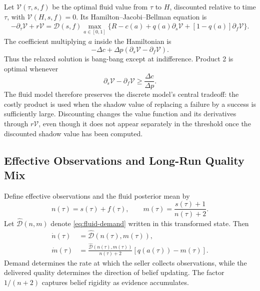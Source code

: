\documentclass[opre]{informs3}
\begin{document}
Let $\mathcal{V}(\tau,s,f)$ be the optimal fluid value from $\tau$ to $H$,
discounted relative to time $\tau$, with $\mathcal{V}(H,s,f)=0$. Its
Hamilton--Jacobi--Bellman equation is
\begin{equation}
\begin{aligned}
    -\partial_\tau\mathcal{V}+r\mathcal{V}
    =
    \mathcal{D}(s,f)
    \max_{a\in[0,1]}
    \big\{
        R-c(a)
        +q(a)\partial_s\mathcal{V}
        +[1-q(a)]\partial_f\mathcal{V}
    \big\}.
\end{aligned}
\label{eq:fluid-hjb}
\end{equation}
The coefficient multiplying $a$ inside the Hamiltonian is
\begin{equation}
    -\Delta c
    +\Delta p
    (\partial_s\mathcal{V}-\partial_f\mathcal{V}).
    \label{eq:fluid-control-coefficient}
\end{equation}
Thus the relaxed solution is bang-bang except at indifference. Product 2 is
optimal whenever
\begin{equation}
    \partial_s\mathcal{V}-\partial_f\mathcal{V}
    \geq
    \frac{\Delta c}{\Delta p}.
    \label{eq:fluid-threshold}
\end{equation}
The fluid model therefore preserves the discrete model's central tradeoff:
the costly product is used when the shadow value of replacing a failure by a
success is sufficiently large. Discounting changes the value function and its
derivatives through $r\mathcal{V}$, even though it does not appear separately
in the threshold once the discounted shadow value has been computed.

\subsection{Effective Observations and Long-Run Quality Mix}

Define effective observations and the fluid posterior mean by
\begin{equation}
    n(\tau)=s(\tau)+f(\tau),
    \qquad
    m(\tau)=\frac{s(\tau)+1}{n(\tau)+2}.
    \label{eq:fluid-transform}
\end{equation}
Let $\widehat{\mathcal{D}}(n,m)$ denote \cref{eq:fluid-demand} written in this
transformed state. Then
\begin{align}
    \dot{n}(\tau)
    &=
    \widehat{\mathcal{D}}(n(\tau),m(\tau)),
    \label{eq:fluid-count}\\
    \dot{m}(\tau)
    &=
    \frac{\widehat{\mathcal{D}}(n(\tau),m(\tau))}{n(\tau)+2}
    [q(a(\tau))-m(\tau)].
    \label{eq:fluid-mean}
\end{align}
Demand determines the rate at which the seller collects observations, while
the delivered quality determines the direction of belief updating. The factor
$1/(n+2)$ captures belief rigidity as evidence accumulates.
\end{document}
